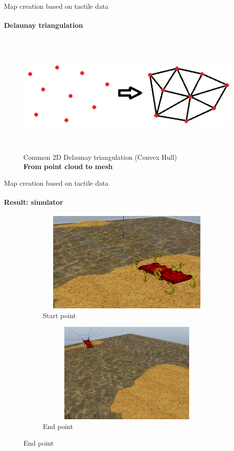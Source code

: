 \documentclass[aspectratio=169]{beamer}
\begin{document}
\begin{frame}[t]{Map creation based on tactile data}
    \framesubtitle{Delaunay triangulation}
    \vspace{-0.2cm}
    \begin{figure}[H]
        \centering\includegraphics[height=6cm,width=1\textwidth,keepaspectratio]{delone_idea.png}
        \caption*{Common 2D Delaunay triangulation (Convex Hull) \\ \textbf{From point cloud to mesh}}
        \label{fig:delone_idea.png}
    \end{figure}
\end{frame}

\begin{frame}[t]{Map creation based on tactile data}
    \framesubtitle{Result: simulator}
    \vspace{-15pt}
    \begin{figure}[H]
        \begin{subfigure}[t]{0.49\textwidth}
            \centering\includegraphics[height=5cm,width=1\textwidth,keepaspectratio]{terrain_w_water1.png}
            \caption*{Start point}
        \end{subfigure}
        \begin{subfigure}[t]{0.49\textwidth}
            \centering\includegraphics[height=5cm,width=1\textwidth,keepaspectratio]{terrain_w_water_end.png}
            \caption*{End point}
        \end{subfigure}
    \end{figure}
\end{frame}
\end{document}
